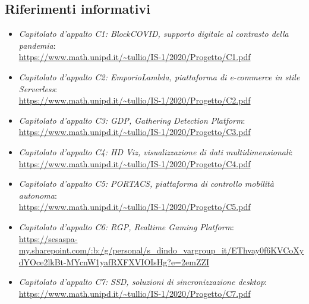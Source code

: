 \subsection{Riferimenti informativi} \label{RiferimentiInformativi}
\begin{itemize}
	\item \textit{Capitolato d'appalto C1: BlockCOVID, supporto digitale al contrasto della pandemia}: \\ 
	\url{https://www.math.unipd.it/~tullio/IS-1/2020/Progetto/C1.pdf}
	\item \textit{Capitolato d'appalto C2: EmporioLambda, piattaforma di e-commerce in stile Serverless}: \\
	\url{https://www.math.unipd.it/~tullio/IS-1/2020/Progetto/C2.pdf}
	\item \textit{Capitolato d'appalto C3: GDP, Gathering Detection Platform}:\\
	\url{https://www.math.unipd.it/~tullio/IS-1/2020/Progetto/C3.pdf}
	\item \textit{Capitolato d'appalto C4: HD Viz, visualizzazione di dati multidimensionali}:\\
	\url{https://www.math.unipd.it/~tullio/IS-1/2020/Progetto/C4.pdf}
	\item \textit{Capitolato d'appalto C5: PORTACS, piattaforma di controllo mobilità autonoma}:\\
	\url{https://www.math.unipd.it/~tullio/IS-1/2020/Progetto/C5.pdf}
	\item \textit{Capitolato d'appalto C6: RGP, Realtime Gaming Platform}:\\
	\url{https://sesaspa-my.sharepoint.com/:b:/g/personal/s\_dindo_vargroup\_it/EThvay0f6KVCoXydYOce2lkBt-MYcnW1yafRXFXVIOIsHg?e=2emZZI}
	\item \textit{Capitolato d'appalto C7: SSD, soluzioni di sincronizzazione desktop}:\\
	\url{https://www.math.unipd.it/~tullio/IS-1/2020/Progetto/C7.pdf}
\end{itemize}